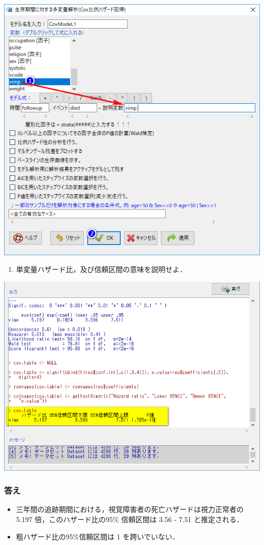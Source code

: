 \documentclass[11pt,]{problemset}
\providecommand{\tightlist}{%
  \setlength{\itemsep}{0pt}\setlength{\parskip}{0pt}}
\begin{document}
\begin{center}\includegraphics[width=0.6\linewidth,height=0.4\textheight]{pic/survival16} \end{center}

\begin{enumerate}
\def\labelenumi{\arabic{enumi}.}
\setcounter{enumi}{4}
\tightlist
\item
  単変量ハザード比，及び信頼区間の意味を説明せよ．
\end{enumerate}

\begin{center}\includegraphics[width=0.6\linewidth,height=0.4\textheight]{pic/survival17} \end{center}

\hypertarget{-8}{%
\subsubsection{答え}\label{-8}}

\begin{itemize}
\item
  三年間の追跡期間における，視覚障害者の死亡ハザードは視力正常者の 5.197
  倍，このハザード比の95\% 信頼区間は 3.56 - 7.51 と推定される．
\item
  粗ハザード比の95\%信頼区間は 1 を跨いでいない．
\end{itemize}
\end{document}

